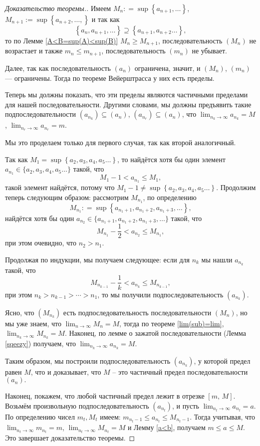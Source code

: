 \begin{proof}[Доказательство теоремы.] Имеем $M_n : = \sup\left\{a_{n+1}, \ldots \right\}$, $M_{n+1}:=\sup \left\{a_{n+2}, \ldots,\right\}$ и так как
\[
\left\{a_n, a_{n+1}, \ldots \right\} \supseteq \left\{a_{n+1}, a_{n+2} \ldots \right\},
\]
то по Лемме \ref{A<B=sup(A)<sup(B)} $M_n \ge M_{n+1}$, \ie последовательность $ (M_n )$ не возрастает и также $m_n \le m_{n+1}$, \ie последовательность $ (m_n )$ не убывает.

Далее, так как последовательность $ (a_n )$ ограничена, значит, и $ (M_n )$, $ (m_n )$ --- ограничены. Тогда по теореме Вейерштрасса у них есть пределы.

Теперь мы должны показать, что эти пределы являются частичными пределами для нашей последовательности. Другими словами, мы должны предъявить такие подпоследовательности $ (a_{n_k} ) \subseteq  (a_n )$, $ (a_{n_r} ) \subseteq  (a_n )$, что $\lim_{n_k \to \infty} a_{n_k} =M$, $\lim_{n_r \to \infty} a_{n_r} =m$.

Мы это проделаем только для первого случая, так как второй аналогичный.

Так как $M_1 = \sup \left\{a_2, a_3, a_4,a_5 \ldots\right\}$, то найдётся хотя бы один элемент $a_{n_1} \in \{a_2, a_3, a_4,a_5 \ldots\}$ такой, что
\[
 M_1 -1< a_{n_1} \le M_1,
\]
такой элемент найдётся, потому что $M_1 -1 \ne \sup \left\{a_2, a_3, a_4,a_5 \ldots\right\}.$ Продолжим теперь следующим образом: рассмотрим $M_{n_1}$, по определению
\[
 M_{n_1}: = \sup \left\{a_{n_1 +1}, a_{n_1+2}, a_{n_1+3},\ldots\right\},
\]
найдётся хотя бы один $a_{n_2} \in \{a_{n_1 +1}, a_{n_1+2}, a_{n_1+3},\ldots\}$ такой, что
\[
 M_{n_1}-\frac{1}{2} < a_{n_2} \le M_{n_1},
\]
при этом очевидно, что $n_2>n_1.$

Продолжая по индукции, мы получаем следующее: если для $n_k$ мы нашли $a_{n_k}$ такой, что
\[
 M_{n_{k-1}} - \frac{1}{k} < a_{n_{k}} \le M_{n_{k-1}},
\]
при этом $n_{k}>n_{k-1}> \cdots > n_1$, то мы получили подпоследовательность $ \left(a_{n_k} \right).$

Ясно, что $\left(M_{n_k} \right)$ есть подпоследовательность последовательности $\left(M_n\right)$, но мы уже знаем, что $\lim_{n\to \infty}M_n = M$, тогда по теореме \ref{lim(sub)=lim}, $\lim_{n_k\to \infty}M_{n_k} = M$. Наконец, по лемме о зажатой последовательности (Лемма \ref{sqeezy}) получаем, что $\lim_{n_k \to \infty}a_{n_k} = M.$

Таким образом, мы построили подпоследовательность $\left(a_{n_k}\right)$, у которой предел равен $M$, что и доказывает, что $M$ -- это частичный предел последовательности $\left(a_n\right).$

Наконец, покажем, что любой частичный предел лежит в отрезке $[m,\,M].$ Возьмём произвольную подпоследовательность $\left(a_{n_t}\right)$, и пусть $\lim_{n_t \to \infty}a_{n_{t}} = a$. По определению чисел $m_t, M_t$ имеем: $m_{n_{t}-1} \le a_{n_t} \le M_{n_t-1}$. Тогда учитывая, что $\lim_{n_t \to \infty} m_{n_t} = m$, $\lim_{n_t \to \infty}M_{n_t} = M$ и Лемму \ref{a<b}, получаем $m\le a \le M$. Это завершает доказательство теоремы.
\end{proof}



